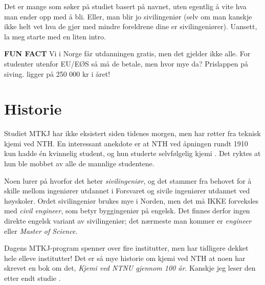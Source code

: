 Det er mange som søker på studiet basert på navnet, uten egentlig å vite hva man ender opp med å bli. Eller, man blir jo sivilingeniør (selv om man kanskje ikke helt vet hva de gjør med mindre foreldrene dine er sivilingeniører). Uansett, la meg starte med en liten intro.

\begin{remark}
    \textbf{FUN FACT} Vi i Norge får utdanningen gratis, men det gjelder ikke alle. For studenter utenfor EU/EØS så må de betale, men hvor mye da? Prislappen på siving. ligger på 250 000 kr i året! \cite{ntnu_studieavgift}
\end{remark}


\section{Historie}

Studiet MTKJ har ikke eksistert siden tidenes morgen, men har røtter fra teknisk kjemi ved NTH. En interessant anekdote er at NTH ved åpningen rundt 1910 kun hadde én kvinnelig student, og hun studerte selvfølgelig kjemi \cite{Kjemi1910}. Det ryktes at hun ble mobbet av alle de mannlige studentene.

Noen lurer på hvorfor det heter \textit{sivilingeniør}, og det stammer fra behovet for å skille mellom ingeniører utdannet i Forsvaret og sivile ingeniører utdannet ved høyskoler. Ordet sivilingeniør brukes mye i Norden, men det må IKKE forveksles med \textit{civil engineer}, som betyr byggingeniør på engelsk. Det finnes derfor ingen direkte engelsk variant av sivilingeniør; det nærmeste man kommer er \textit{engineer} eller \textit{Master of Science}.

Dagens MTKJ-program spenner over fire institutter, men har tidligere dekket hele elleve institutter! Det er så mye historie om kjemi ved NTH at noen har skrevet en bok om det, \textit{Kjemi ved NTNU gjennom 100 år}. Kanskje jeg leser den etter endt studie \cite{Kjemi100}.

\begin{table}[H]
    \centering
    \begin{minipage}[t]{.8\linewidth}
        \centering
        \color{gray}
        \bigskip
    \end{minipage}
\end{table}

